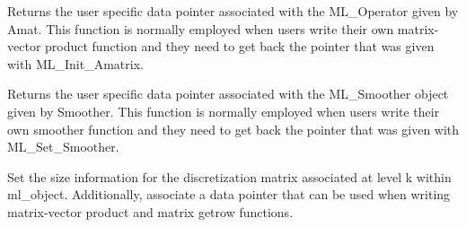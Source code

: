Returns the user specific data pointer associated with the ML\_Operator
given by Amat. This function is normally employed when users write
their own matrix-vector product function and they need to get back the 
pointer that was given with ML\_Init\_Amatrix.

\vspace{2em}
{ \hrulefill}
\vspace{1em}






\vspace{2em}
{ \hrulefill}
\vspace{1em}

Returns the user specific data pointer associated with the ML\_Smoother
object given by Smoother.
This function is normally employed when users write
their own smoother function and they need to get back the 
pointer that was given with ML\_Set\_Smoother.

\vspace{2em}
{ \hrulefill}
\vspace{1em}





\vspace{2em}
{ \hrulefill}
\vspace{1em}

Set the size information for the discretization matrix associated at level k within
ml\_object.  Additionally, associate a data pointer that can be used
when writing matrix-vector product and matrix getrow functions.

\vspace{2em}
{ \hrulefill}
\vspace{1em}

